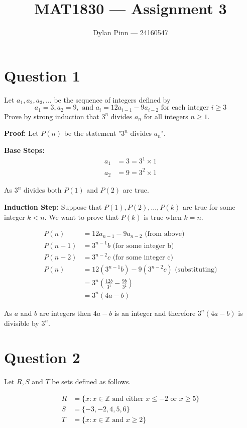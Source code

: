 \documentclass[11pt]{article}
\begin{document}
\title{MAT1830 --- Assignment 3}
\author{Dylan Pinn --- 24160547}
\maketitle

\section*{Question 1}
Let $a_1,a_2,a_3,\dots$ be the sequence of integers defined by
$$a_1=3,a_2=9,\text{ and } a_i=12a_{i-1}-9a_{i-2} \text{ for each integer } i \geq 3$$
Prove by strong induction that $3^n$ divides $a_n$ for all integers $n \geq1$.

\textbf{Proof:} Let $P(n)$ be the statement "$3^n$ divides $a_n$".

\textbf{Base Steps:}
\begin{align*}
	a_1 &= 3 = 3^1 \times 1 \\
	a_2 &= 9 = 3^2 \times 1
\end{align*}

As $3^n$ divides both $P(1)$ and $P(2)$ are true.

\textbf{Induction Step:}
Suppose that $P(1),P(2),\dots,P(k)$ are true for some integer $k < n$. We want to prove that $P(k)$ is true when $k = n$.

\begin{align*}
	P(n) &= 12a_{n-1} - 9a_{n-2} \text{ (from above) } \\
	P(n-1) &= 3^{n-1}b \text{ (for some integer b)} \\
	P(n-2) &= 3^{n-2}c \text{ (for some integer c)} \\
	P(n) &= 12(3^{n-1}b) - 9(3^{n-2}c) \text{ (substituting)} \\
	&= 3^n(\frac{12b}{3^1} - \frac{9b}{3^2}) \\
	&= 3^n(4a - b)
\end{align*}

As $a$ and $b$ are integers then $4a-b$ is an integer and therefore $3^n(4a-b)$ is divisible by $3^n$.

\break
\section*{Question 2}
Let $R,S$ and $T$ be sets defined as follows.

\begin{align*}
	R &= \{ x: x \in \mathbb{Z} \text{ and either } x \leq -2 \text{ or } x \geq 5 \} \\
	S &= \{ -3,-2,4,5,6 \} \\
	T &= \{ x: x \in \mathbb{Z} \text{ and } x \geq 2 \}
\end{align*}
\end{document}

